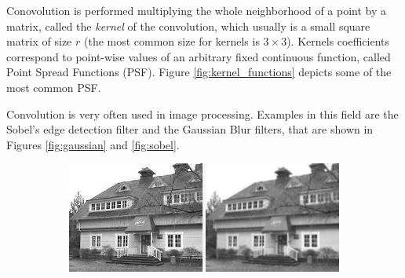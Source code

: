 Conovolution is performed multiplying the whole neighborhood of a point by a  matrix, called the \textit{kernel} of the convolution, which usually is a small square matrix of size $r$ (the most common size for kernels is $3\times 3$).
Kernels coefficients correspond to point-wise values of an arbitrary fixed continuous function, called Point Spread Functions (PSF). Figure \ref{fig:kernel_functions} depicts some of the most common PSF.

Convolution is very often used in image processing. Examples in this field are the Sobel's edge detection filter and the Gaussian Blur filters, that are shown in Figures \ref{fig:gaussian} and \ref{fig:sobel}.


\begin{figure}
    \begin{subfigure}{1.0\textwidth}
        \includegraphics[width=\linewidth]{./images/opencal/gaussian_example}
        
            
    \end{subfigure}
    

\end{figure}
